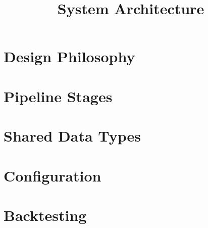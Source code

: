 \documentclass[11pt]{article}
\title{System Architecture}
\author{}
\date{}
\begin{document}
\maketitle


\section{Design Philosophy}

\section{Pipeline Stages}

\section{Shared Data Types}

\section{Configuration}

\section{Backtesting}
\end{document}
